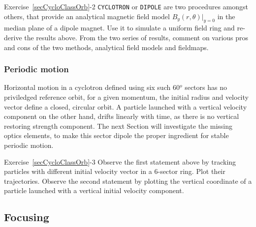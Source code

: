 \smallskip
\noindent {\small $\bullet$} Exercise~\ref{secCycloClassOrb}-2 
 \verb|CYCLOTRON| or \verb|DIPOLE| are two procedures amongst others, that provide an analytical 
 magnetic field model ${B_y(r,\theta)|_{y=0}}$ in the median plane of a dipole magnet. 
Use it to simulate a uniform field ring and re-derive the results above. 
From the two series of results, comment on various pros and cons of the two methods, analytical field models and 
fieldmaps.



\subsubsection*{Periodic motion \label{secCycloFocus}}

Horizontal motion in a  cyclotron defined using six such 60$^o$ sectors has no priviledged reference orbit, 
for a given momentum, the initial radius and velocity vector define a closed, circular orbit.  
A particle launched with a vertical velocity component on the other hand, drifts linearly with time, as there is no 
vertical restoring strength component. The next Section will investigate the missing optics elements, 
to make this sector dipole the proper ingredient for  stable periodic motion. 


\smallskip
\noindent {\small $\bullet$} Exercise~\ref{secCycloClassOrb}-3 
Observe the first statement above by tracking  particles with different initial velocity vector in a 6-sector ring. 
Plot their trajectories. 
Observe the second statement by plotting the vertical coordinate  of a particle launched with a 
vertical initial velocity component. 



\subsection{Focusing  \label{secCycloFocus}}

